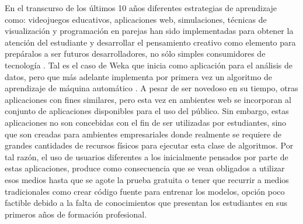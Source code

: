 En el transcurso de los últimos 10 años diferentes estrategias de aprendizaje como: videojuegos educativos, aplicaciones web, simulaciones, técnicas de visualización y programación en parejas han sido implementadas para obtener la atención del estudiante y desarrollar el pensamiento creativo como elemento para prepáralos a ser futuros desarrolladores, no sólo simples consumidores de tecnología \parencite{Salleh2013}. Tal es el caso de Weka \parencite{Hall2009} que inicia como aplicación para el análisis de datos, pero que más adelante implementa por primera vez un algoritmo de aprendizaje de máquina automático \parencite{Thornton2013}. A pesar de ser novedoso en su tiempo, otras aplicaciones con fines similares, pero esta vez en ambientes web se incorporan al conjunto de aplicaciones disponibles para el uso del público. Sin embargo, estas aplicaciones no son concebidas con el fin de ser utilizadas por estudiantes, sino que son creadas para ambientes empresariales donde realmente se requiere de grandes cantidades de recursos físicos para ejecutar esta clase de algoritmos. Por tal razón, el uso de usuarios diferentes a los inicialmente pensados por parte de estas aplicaciones, produce como consecuencia que se vean obligados a utilizar esos medios hasta que se agote la prueba gratuita o tener que recurrir a medios tradicionales como crear código fuente para entrenar los modelos, opción poco factible debido a la falta de conocimientos que presentan los estudiantes en sus primeros años de formación profesional.

